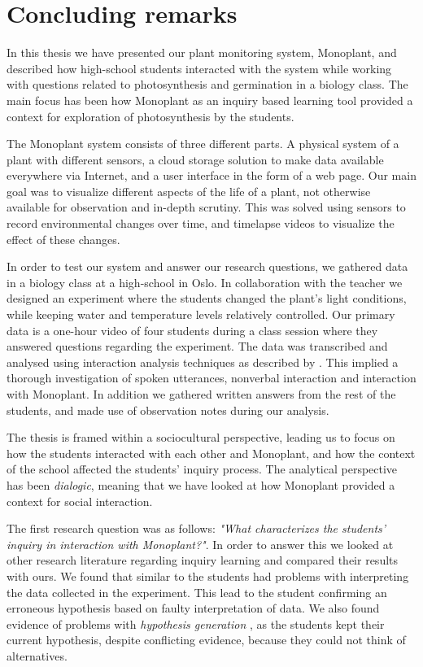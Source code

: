 \chapter{Concluding remarks}
In this thesis we have presented our plant monitoring system, Monoplant, and described how high-school students interacted with the system while working with questions related to photosynthesis and germination in a biology class. The main focus has been how Monoplant as an inquiry based learning tool provided a context for exploration of photosynthesis by the students. 

The Monoplant system consists of three different parts. A physical system of a plant with different sensors, a cloud storage solution to make data available everywhere via Internet, and a user interface in the form of a web page. Our main goal was to visualize different aspects of the life of a plant, not otherwise available for observation and in-depth scrutiny. This was solved using sensors to record environmental changes over time, and timelapse videos to visualize the effect of these changes. 

In order to test our system and answer our research questions, we gathered data in a biology class at a high-school in Oslo. In collaboration with the teacher we designed an experiment where the students changed the plant's light conditions, while keeping water and temperature levels relatively controlled. Our primary data is a one-hour video of four students during a class session where they answered questions regarding the experiment. The data was transcribed and analysed using interaction analysis techniques as described by \citet{jordan1995interaction}. This implied a thorough investigation of spoken utterances, nonverbal interaction and interaction with Monoplant. In addition we gathered written answers from the rest of the students, and made use of observation notes during our analysis. 

The thesis is framed within a sociocultural perspective, leading us to focus on how the students interacted with each other and Monoplant, and how the context of the school affected the students' inquiry process. The analytical perspective has been \emph{dialogic}, meaning that we have looked at how Monoplant provided a context for social interaction. 

The first research question was as follows: \emph{"What characterizes the students’ inquiry in interaction with Monoplant?"}. In order to answer this we looked at other research literature regarding inquiry learning and compared their results with ours. We found that similar to \citeauthor*{klahr1993heuristics} \citetext{\citeyear{klahr1993heuristics}, referenced in \citealp{de1998scientific}} the students had problems with interpreting the data collected in the experiment. This lead to the student confirming an erroneous hypothesis based on faulty interpretation of data. We also found evidence of problems with \emph{hypothesis generation} \citep{de1998scientific}, as the students kept their current hypothesis, despite conflicting evidence, because they could not think of alternatives. 

